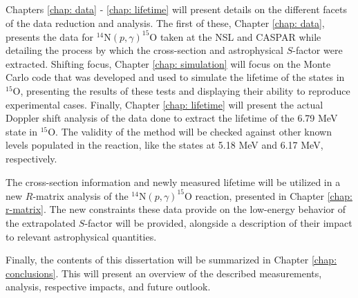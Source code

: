 Chapters \ref{chap: data} - \ref{chap: lifetime} will present details on the different facets of the data reduction and analysis. The first of these, Chapter \ref{chap: data}, presents the data for $^{14}$N$\left( p,\gamma \right) ^{15}$O taken at the NSL and CASPAR while detailing the process by which the cross-section and astrophysical $S$-factor were extracted. Shifting focus, Chapter \ref{chap: simulation} will focus on the Monte Carlo code that was developed and used to simulate the lifetime of the states in $^{15}$O, presenting the results of these tests and displaying their ability to reproduce experimental cases. Finally, Chapter \ref{chap: lifetime} will present the actual Doppler shift analysis of the data done to extract the lifetime of the 6.79 MeV state in $^{15}$O. The validity of the method will be checked against other known levels populated in the reaction, like the states at 5.18 MeV and 6.17 MeV, respectively.

The cross-section information and newly measured lifetime will be utilized in a new $R$-matrix analysis of the $^{14}$N$\left( p,\gamma \right) ^{15}$O reaction, presented in Chapter \ref{chap: r-matrix}. The new constraints these data provide on the low-energy behavior of the extrapolated $S$-factor will be provided, alongside a description of their impact to relevant astrophysical quantities.

Finally, the contents of this dissertation will be summarized in Chapter \ref{chap: conclusions}. This will present an overview of the described measurements, analysis, respective impacts, and future outlook. 

%
% 
% 
